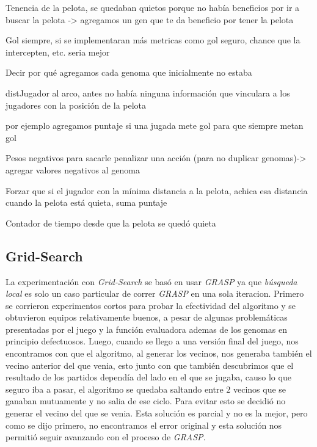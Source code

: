 Tenencia de la pelota, se quedaban quietos porque no había beneficios por ir a buscar la pelota -> agregamos un gen que te da beneficio por tener la pelota

Gol siempre, si se implementaran más metricas como gol seguro, chance que la intercepten, etc. seria mejor

Decir por qué agregamos cada genoma que inicialmente no estaba

distJugador al arco, antes no había ninguna información que vinculara a los jugadores con la posición de la pelota

por ejemplo agregamos puntaje si una jugada mete gol para que siempre metan gol

Pesos negativos para sacarle penalizar una acción (para no duplicar genomas)-> agregar valores negativos al genoma


Forzar que si el jugador con la mínima distancia a la pelota, achica esa distancia cuando la pelota está quieta, suma puntaje

Contador de tiempo desde que la pelota se quedó quieta




\subsection{Grid-Search}

La experimentación con \emph{Grid-Search} se basó en usar \emph{GRASP} ya que \emph{búsqueda local} es solo un caso particular
de correr \emph{GRASP} en una sola iteracion.
Primero se corrieron experimentos cortos para probar la efectividad del algoritmo y se obtuvieron equipos relativamente buenos,
a pesar de algunas problemáticas presentadas por el juego y la función evaluadora ademas de los genomas en principio defectuosos.
Luego, cuando se llego a una versión final del juego, nos encontramos con que el algoritmo, al generar los vecinos, nos generaba también
el vecino anterior del que venia, esto junto con que también descubrimos que el resultado de los partidos dependía del lado en el
que se jugaba, causo lo que seguro iba a pasar, el algoritmo se quedaba saltando entre $2$ vecinos que se ganaban mutuamente y no
salia de ese ciclo.
Para evitar esto se decidió no generar el vecino del que se venia. Esta solución es parcial y no es la mejor, pero como se dijo primero,
no encontramos el error original y esta solución nos permitió seguir avanzando con el proceso de \emph{GRASP}.\\



